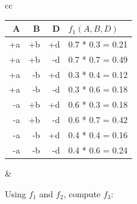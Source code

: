 \documentclass[12pt]{article}
\begin{document}
\begin{center}
\begin{tabular}{cc}
\begin{tabular}{|r|r|r|l|} \hline
A  & B  & D  & $f_1(A,B,D)$ \\ \hline
+a & +b & +d & 0.7 * 0.3 = 0.21 \\ \hline
+a & +b & -d & 0.7 * 0.7 = 0.49 \\ \hline
+a & -b & +d & 0.3 * 0.4 = 0.12 \\ \hline
+a & -b & -d & 0.3 * 0.6 = 0.18 \\ \hline
-a & +b & +d & 0.6 * 0.3 = 0.18 \\ \hline
-a & +b & -d & 0.6 * 0.7 = 0.42 \\ \hline
-a & -b & +d & 0.4 * 0.4 = 0.16 \\ \hline
-a & -b & -d & 0.4 * 0.6 = 0.24 \\ \hline
\end{tabular} &
\end{tabular}


\end{center}

\vspace*{0.2in}

Using $f_1$ and $f_2$, compute $f_3$:
\end{document}
